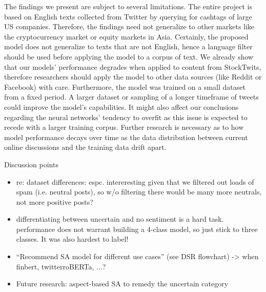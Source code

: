 The findings we present are subject to several limitations. The entire project is based on English texts collected from Twitter by querying for cashtags of large US companies. Therefore, the findings need not generalize to other markets like the cryptocurrency market or equity markets in Asia. Certainly, the proposed model does not generalize to texts that are not English, hence a language filter should be used before applying the model to a corpus of text. We already show that our models' performance degrades when applied to content from StockTwits, therefore researchers should apply the model to other data sources (like Reddit or Facebook) with care. Furthermore, the model was trained on a small dataset from a fixed period. A larger dataset or sampling of a longer timeframe of tweets could improve the model's capabilities. It might also affect our conclusions regarding the neural networks' tendency to overfit as this issue is expected to recede with a larger training corpus. Further research is necessary as to how model performance decays over time as the data distribution between current online discussions and the training data drift apart.










\newpage
Discussion points
\begin{itemize}[noitemsep]
	\item re: dataset differences: espc. intereresting given that we filtered out loads of spam (i.e. neutral posts), so w/o filtering there would be many more neutrals, not more positive posts?
	\item differentiating between uncertain and no sentiment is a hard task. performance does not warrant building a 4-class model, so just stick to three classes. It was also hardest to label!
	\item ``Recommend SA model for different use cases'' (see DSR flowchart) -> when finbert, twitterroBERTa, ...?
	\item Future research: aspect-based SA to remedy the uncertain category
\end{itemize}